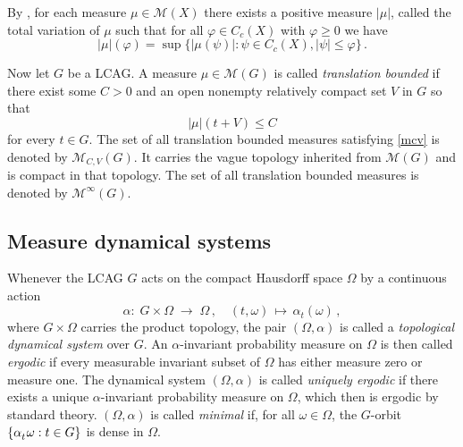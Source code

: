 \documentclass[11pt, a4wide]{amsart}
\newcommand{\ts}{\hspace{0.5pt}}
\newcommand{\MM}{\mathcal{M}(G)}
\newcommand{\MCV}{\mathcal{M}_{C,V}(G)}
\newcommand{\MTB}{\mathcal{M}^{\infty}(G)}
\newcommand{\Oomega}{(\varOmega,\alpha)}
\numberwithin{lemma}{section}
\begin{document}
\smallskip


By \cite[Thm.~6.5.6]{Ped}, for each measure 
 $\mu \in \mathcal{M} (X)$ there exists a positive measure $|\mu|$, called the total variation of $\mu$ such that
for all $\varphi \in C_c(X)$ with $\varphi \geq 0$ we have
\[
|\mu|(\varphi) = \sup \{ \left| \mu(\psi) \right| : \psi \in C_c(X), |\psi| \leq \varphi \} \,.
\]

Now let $G$ be a LCAG. A measure $\mu\in \MM $ is called {\em translation bounded\/} if
there exist some  $C>0$ and an open nonempty relatively compact  set $V$ in $G$  so
that
\begin{equation}\label{mcv} |\mu| (t+V) \leq C
\end{equation}
for every $t\in G$.
The set of all translation bounded measures
satisfying \eqref{mcv} is denoted by $\MCV$. It carries the vague topology inherited from $\MM$ and is compact in that topology. The set of all translation bounded measures is denoted by $\MTB$.





\subsection{Measure dynamical systems}\label{sec:mds}
Whenever the LCAG  $G$ acts on the compact Hausdorff  space $\varOmega$  by a continuous action
\begin{equation*}
   \alpha \! : \; G\times \varOmega \; \longrightarrow \; \varOmega
   \, , \quad (t,\omega) \, \mapsto \, \alpha^{}_{t} (\omega) \, ,
\end{equation*}
where $G\times \varOmega$ carries the product topology, the pair
$\Oomega$ is called a {\em topological dynamical system\/} over $G$.
An $\alpha$-invariant probability measure on $\varOmega$ is then
called {\em ergodic\/} if every measurable invariant subset of
$\varOmega$ has either measure zero or measure one. The dynamical
system $\Oomega$ is called {\em uniquely ergodic\/} if there exists a
unique $\alpha$-invariant probability measure on $\varOmega$, which
then is ergodic by standard theory. $\Oomega$ is called {\em
minimal\/} if, for all $\omega\in\varOmega$, the $G$-orbit
$\{\alpha^{}_t\ts \omega : t \in G\}$ is dense in $\varOmega$.
\end{document}
